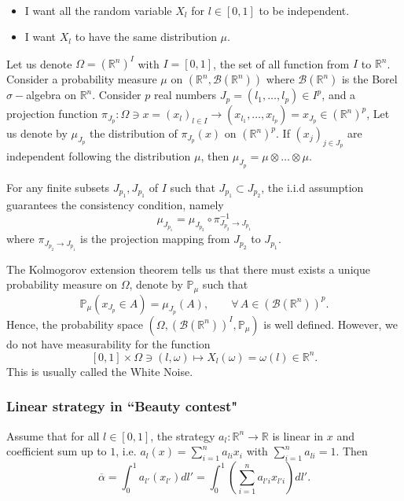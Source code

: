 \begin{remark} 
	\ 
	\begin{itemize}
	\item I want all the random variable $X_l$ for $l \in [0,1]$ to be independent.
	\item I want $X_l$ to have the same distribution $\mu$.
	\end{itemize}

	Let us denote $\Omega = (\mathbb{R}^n)^{I}$ with $I=[0,1]$, the set of all function from $I$ to $\mathbb{R}^n$. Consider a probability measure $\mu$ on $(\mathbb{R}^n, \mathcal{B}(\mathbb{R}^n))$ where $\mathcal{B}(\mathbb{R}^n)$ is the Borel $\sigma-$algebra on $\mathbb{R}^n$. Consider $p$ real numbers $J_p = (l_1, \ldots, l_p) \in I^p$, and a projection function $\pi_{J_p}: \Omega \ni x = (x_l)_{l\in I} \to (x_{l_1}, \ldots, x_{l_p}) = x_{J_p} \in (\mathbb{R}^n)^p$, 
	Let us denote by $\mu_{J_p}$ the distribution of $\pi_{J_p}(x)$ on $(\mathbb{R}^n)^p$. If $(x_j)_{j \in J_p}$ are independent following the distribution $\mu$, then $\mu_{J_p} = \mu \otimes \ldots \otimes \mu$. 
	
	For any finite subsets $J_{p_1}, J_{p_1}$ of $I$ such that $J_{p_1} \subset J_{p_2}$, the i.i.d assumption guarantees the consistency condition, namely 
	$$
		\mu_{J_{p_1}} = \mu_{J_{p_2}} \circ \pi_{J_{p_2} \to J_{p_1}}^{-1}
	$$  
	where $\pi_{J_{p_2} \to J_{p_1} }$ is the projection mapping from $J_{p_2}$ to $J_{p_1}$.
	
	The Kolmogorov extension theorem tells us that there must exists a unique probability measure on $\Omega$, denote by $\mathbb{P}_\mu$ such that
	$$
		\mathbb{P}_\mu( x_{J_p}  \in A) = \mu_{J_p}(A), \qquad \forall \, A \in (\mathcal{B}(\mathbb{R}^n) )^p.
	$$
	Hence, the probability space $(\Omega, (\mathcal{B}(\mathbb{R}^n) )^I, \mathbb{P}_\mu)$ is well defined.		
	However, we do not have measurability for the function 
	$$
		[0,1] \times \Omega \ni (l, \omega) \mapsto X_l(\omega) = \omega(l) \in \mathbb{R}^n.
	$$
	This is usually called the White Noise.
\end{remark}


\subsubsection{Linear strategy in ``Beauty contest"}

Assume that for all $l \in [0,1]$, the strategy $a_l : \mathbb{R}^n \to \mathbb{R}$ is linear in $x$ and coefficient sum up to $1$, i.e. $a_l(x) = \sum_{i=1}^n a_{li} x_i$ with $\sum_{i=1}^n a_{li} = 1$.
Then
\begin{equation}
	\overline{\alpha} =  \int_{0}^1 a_{l'}(x_{l'}) dl' = \int_0^1 \left( \sum_{i=1}^n a_{l'i} x_{l'i} \right) dl'.
\end{equation} 

